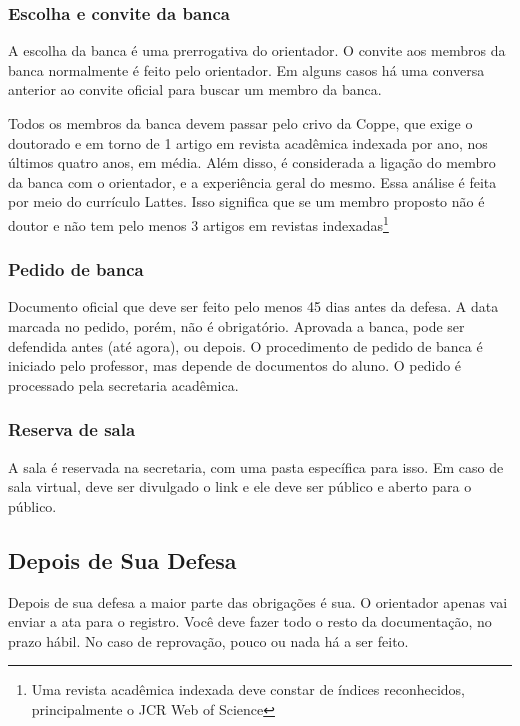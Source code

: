 \documentclass[a4paper,12pt]{article}
\begin{document}
\subsubsection{Escolha e convite da banca}

A escolha da banca é uma prerrogativa do orientador. O convite aos membros da banca normalmente é feito pelo orientador. Em alguns casos há uma conversa anterior ao convite oficial para buscar um membro da banca.

Todos os membros da banca devem passar pelo crivo da Coppe, que exige o doutorado e em torno de 1 artigo em revista acadêmica indexada por ano, nos últimos quatro anos, em média. Além disso, é considerada a ligação do membro da banca com o orientador, e a experiência geral do mesmo. Essa análise é feita por meio do currículo Lattes. Isso significa que se um membro proposto não é doutor e não tem pelo menos 3 artigos em revistas indexadas\footnote{Uma revista acadêmica indexada deve constar de índices reconhecidos, principalmente o JCR Web of Science}

\subsubsection{Pedido de banca}

Documento oficial que deve ser feito pelo menos 45 dias antes da defesa. A data marcada no pedido, porém, não é obrigatório. Aprovada a banca, pode ser defendida antes (até agora), ou depois. O procedimento de pedido de banca é iniciado pelo professor, mas depende de documentos do aluno. O pedido é processado pela secretaria acadêmica.

\subsubsection{Reserva de sala}

A sala é reservada na secretaria, com uma pasta específica para isso. Em caso de sala virtual, deve ser divulgado o link e ele deve ser público e aberto para o público. 

\subsection{Depois de Sua Defesa}

Depois de sua defesa a maior parte das obrigações é sua. O orientador apenas vai enviar a ata para o registro. Você deve fazer todo o resto da documentação, no prazo hábil. No caso de reprovação, pouco ou nada há a ser feito.
\end{document}
